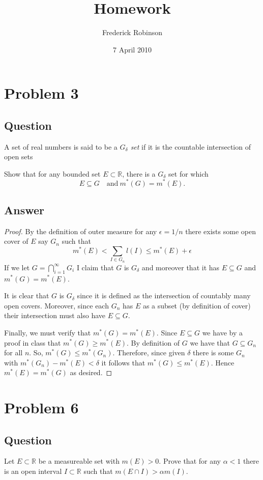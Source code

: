 \documentclass[12pt]{article}
\title{Homework}
\author{Frederick Robinson}
\date{7 April 2010}
\begin{document}

   \maketitle

\setcounter{tocdepth}{2} 

\section{Problem 3}
\subsection{Question}
A set of real numbers is said to be a \emph{$G_\delta$ set} if it is the countable intersection of open sets 

Show that for any bounded set $E \subset \mathbb{R}$, there is a $G_\delta$ set for which
\[E \subseteq G \quad \mathrm{and\ } m^*(G)=m^*(E).\]
\subsection{Answer}
\begin{proof}
By the definition of outer measure for any $\epsilon = 1/n$ there exists some open cover of $E$ say $G_n$ such that
\[m^*(E)<\sum_{I \in G_n} l(I) \leq m^*(E)+\epsilon\]
If we let $G=\bigcap_{i=1}^\infty G_i$ I claim that $G$ is $G_\delta$ and moreover that it has $E \subseteq G$ and $m^*(G)=m^*(E)$.

It is clear that $G$ is $G_\delta$ since it is defined as the intersection of countably many open covers. Moreover, since each $G_n$ has $E$ as a subset (by definition of cover) their intersection must also have $E \subseteq G$.

Finally, we must verify that $m^*(G)=m^*(E)$. Since $E \subseteq G$ we have by a proof in class that $m^*(G)\geq m^*(E)$. By definition of $G$ we have that $G \subseteq G_n$ for all $n$. So, $m^*(G)\leq m^*(G_n)$. Therefore, since given $\delta$ there is some $G_n$ with $m^*(G_n)-m^*(E)<\delta$ it follows that $m^*(G)\leq m^*(E)$. Hence $m^*(E)=m^*(G)$ as desired.\end{proof}


\section{Problem 6}
\subsection{Question}
Let $E\subset\mathbb{R}$ be a measureable set with $m(E)>0$. Prove that for any $\alpha<1$ there is an open interval $I \subset \mathbb{R}$ such that $m(E \cap I) > \alpha m(I)$.
\end{document}
